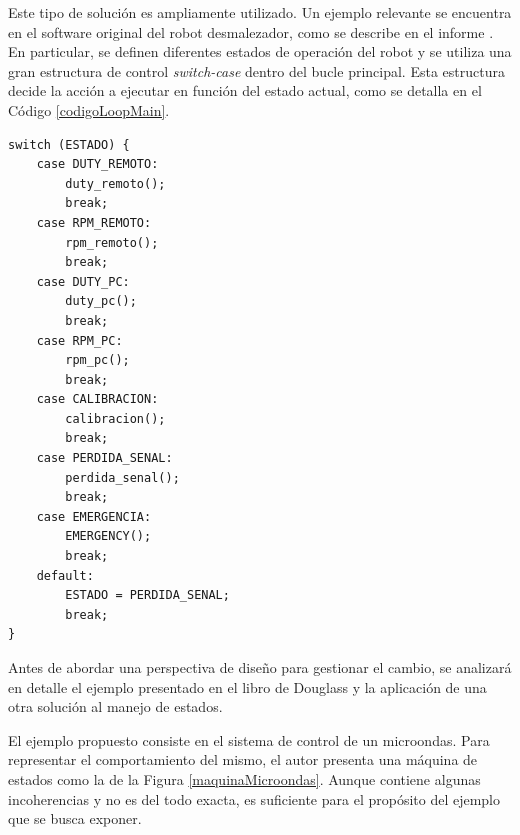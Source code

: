 Este tipo de solución es ampliamente utilizado. Un ejemplo relevante se encuentra en el software original del robot desmalezador, como se describe en el informe \cite{informe1}. En particular, se definen diferentes estados de operación del robot y se utiliza una gran estructura de control \textit{switch-case} dentro del bucle principal. Esta estructura decide la acción a ejecutar en función del estado actual, como se detalla en el Código \ref{codigoLoopMain}.

\begin{lstlisting}[caption=Main loop del previo firmware del robot desmalezador \cite{informe1}, label={codigoLoopMain}]
switch (ESTADO) {
	case DUTY_REMOTO:
		duty_remoto();
		break;
	case RPM_REMOTO:
		rpm_remoto();
		break;
	case DUTY_PC:
		duty_pc();
		break;
	case RPM_PC:
		rpm_pc();
		break;	
	case CALIBRACION:
		calibracion();
		break;
	case PERDIDA_SENAL:
		perdida_senal();
		break;
	case EMERGENCIA:
		EMERGENCY();
		break;
	default:
		ESTADO = PERDIDA_SENAL;
		break;
}
\end{lstlisting}

Antes de abordar una perspectiva de diseño para gestionar el cambio, se analizará en detalle el ejemplo presentado en el libro de Douglass \cite{douglass} y la aplicación de una otra solución al manejo de estados.

El ejemplo propuesto consiste en el sistema de control de un microondas. Para representar el comportamiento del mismo, el autor presenta una máquina de estados como la de la Figura \ref{maquinaMicroondas}. Aunque contiene algunas incoherencias y no es del todo exacta, es suficiente para el propósito del ejemplo que se busca exponer.

